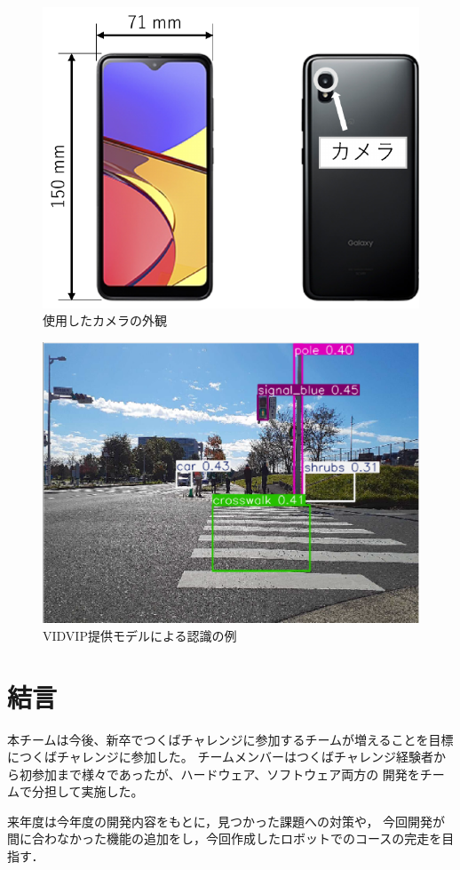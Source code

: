 \documentclass[twocolumn,9pt]{jsproceedings}
\begin{document}
\begin{figure}[h]
  \begin{center}
    \includegraphics[width=0.6\linewidth]{figs/smartphone.pdf}
    \caption{使用したカメラの外観}
    \label{fig:smartphone}
  \end{center}
\end{figure}

\begin{figure}[h]
  \begin{center}
    \includegraphics[width=0.6\linewidth]{figs/result_of_yolo.pdf}
    \caption{VIDVIP提供モデルによる認識の例}
    \label{fig:result_yolo}
  \end{center}
\end{figure}
\section{結言}
本チームは今後、新卒でつくばチャレンジに参加するチームが増えることを目標につくばチャレンジに参加した。
チームメンバーはつくばチャレンジ経験者から初参加まで様々であったが、ハードウェア、ソフトウェア両方の
開発をチームで分担して実施した。

来年度は今年度の開発内容をもとに，見つかった課題への対策や，
今回開発が間に合わなかった機能の追加をし，今回作成したロボットでのコースの完走を目指す．
\end{document}
